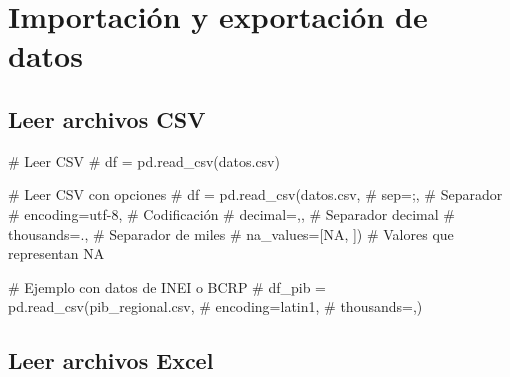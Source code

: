 \documentclass[
  doc,
  floatsintext,
  longtable,
  a4paper,
  nolmodern,
  notxfonts,
  notimes,
  12pt,
  colorlinks=true,linkcolor=blue,citecolor=blue,urlcolor=blue]{apa7}
\newenvironment{Shaded}{\begin{snugshade}}{\end{snugshade}}
\newcommand{\CommentTok}[1]{\textcolor[rgb]{0.37,0.37,0.37}{#1}}
\begin{document}
\section{Importación y exportación de
datos}\label{importaciuxf3n-y-exportaciuxf3n-de-datos}

\subsection{Leer archivos CSV}\label{leer-archivos-csv}

\begin{Shaded}
\begin{Highlighting}[]
\CommentTok{\# Leer CSV}
\CommentTok{\# df = pd.read\_csv(\textquotesingle{}datos.csv\textquotesingle{})}

\CommentTok{\# Leer CSV con opciones}
\CommentTok{\# df = pd.read\_csv(\textquotesingle{}datos.csv\textquotesingle{},}
\CommentTok{\#                  sep=\textquotesingle{};\textquotesingle{},              \# Separador}
\CommentTok{\#                  encoding=\textquotesingle{}utf{-}8\textquotesingle{},     \# Codificación}
\CommentTok{\#                  decimal=\textquotesingle{},\textquotesingle{},          \# Separador decimal}
\CommentTok{\#                  thousands=\textquotesingle{}.\textquotesingle{},        \# Separador de miles}
\CommentTok{\#                  na\_values=[\textquotesingle{}NA\textquotesingle{}, \textquotesingle{}\textquotesingle{}])  \# Valores que representan NA}

\CommentTok{\# Ejemplo con datos de INEI o BCRP}
\CommentTok{\# df\_pib = pd.read\_csv(\textquotesingle{}pib\_regional.csv\textquotesingle{}, }
\CommentTok{\#                      encoding=\textquotesingle{}latin1\textquotesingle{},}
\CommentTok{\#                      thousands=\textquotesingle{},\textquotesingle{})}
\end{Highlighting}
\end{Shaded}

\subsection{Leer archivos Excel}\label{leer-archivos-excel}
\end{document}
